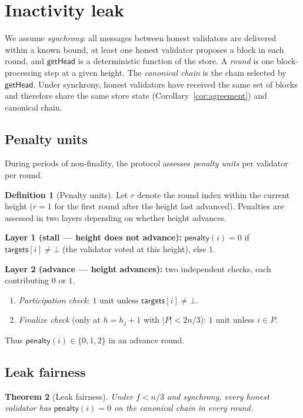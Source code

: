 \ifx\litemode\undefined\documentclass{article}\fi
\newcommand{\targets}{\mathsf{targets}}
\newcommand{\pnlty}{\mathsf{penalty}}
\theoremstyle{plain}
\newtheorem{theorem}{Theorem}
\theoremstyle{definition}
\newtheorem{definition}[theorem]{Definition}
\theoremstyle{remark}
\begin{document}
\section{Inactivity leak}

We assume \emph{synchrony}: all messages between honest validators are delivered within a known bound, at least one honest validator proposes a block in each round, and $\textsf{getHead}$ is a deterministic function of the store.
A \emph{round} is one block-processing step at a given height.
The \emph{canonical chain} is the chain selected by $\textsf{getHead}$.
Under synchrony, honest validators have received the same set of blocks and therefore share the same store state (Corollary~\ref{cor:agreement}) and canonical chain.

\subsection{Penalty units}

During periods of non-finality, the protocol assesses \emph{penalty units} per validator per round.

\begin{definition}[Penalty units]\label{def:penalty}
Let $r$ denote the round index within the current height ($r = 1$ for the first round after the height last advanced).
Penalties are assessed in two layers depending on whether height advances.

\medskip\noindent\textbf{Layer 1 (stall --- height does not advance):}
$\pnlty(i) = 0$ if $\targets[i] \neq \bot$ (the validator voted at this height), else $1$.

\medskip\noindent\textbf{Layer 2 (advance --- height advances):}
two independent checks, each contributing $0$ or $1$.
\begin{enumerate}
  \item \emph{Participation check}: $1$ unit unless $\targets[i] \neq \bot$.
  \item \emph{Finalize check} (only at $h = h_j + 1$ with $|P| < 2n/3$): $1$ unit unless $i \in P$.
\end{enumerate}
Thus $\pnlty(i) \in \{0, 1, 2\}$ in an advance round.
\end{definition}

\subsection{Leak fairness}

\begin{theorem}[Leak fairness]\label{thm:fairness}
Under $f < n/3$ and synchrony, every honest validator has $\pnlty(i) = 0$ on the canonical chain in every round.
\end{theorem}
\end{document}
